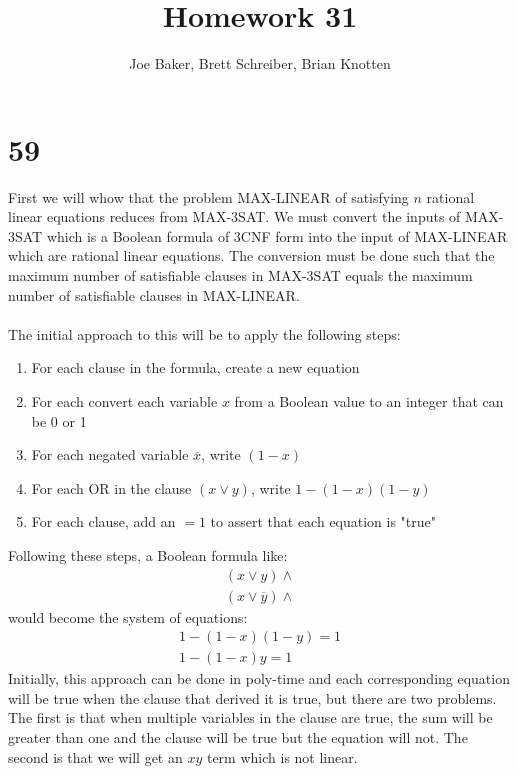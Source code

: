 \documentclass[letterpaper,notitlepage,twoside]{article}
\begin{document}
\title{Homework 31}
\author{Joe Baker, Brett Schreiber, Brian Knotten}
\maketitle

\section*{59}
First we will whow that the problem MAX-LINEAR of satisfying $n$ rational linear equations reduces from MAX-3SAT. We must convert the inputs of MAX-3SAT which is a Boolean formula of 3CNF form into the input of MAX-LINEAR which are rational linear equations. The conversion must be done such that the maximum number of satisfiable clauses in MAX-3SAT equals the maximum number of satisfiable clauses in MAX-LINEAR.
\\\\
The initial approach to this will be to apply the following steps:
\begin{enumerate}
\item For each clause in the formula, create a new equation
\item For each convert each variable $x$ from a Boolean value to an integer that can be 0 or 1
\item For each negated variable $\overline{x}$, write $(1-x)$
\item For each OR in the clause $(x \lor y)$, write $1 - (1 - x)(1 - y)$
\item For each clause, add an $= 1$ to assert that each equation is "true"
\end{enumerate}
Following these steps, a Boolean formula like:
\begin{gather*}
(x \vee y) \wedge \\
(x \vee \overline{y}) \wedge
\end{gather*}
would become the system of equations:
\begin{gather*}
1 - (1 - x)(1 - y)  = 1 \\
1 - (1 - x)y = 1
\end{gather*}
Initially, this approach can be done in poly-time and each corresponding equation will be true when the clause that derived it is true, but there are two problems. The first is that when multiple variables in the clause are true, the sum will be greater than one and the clause will be true but the equation will not. The second is that we will get an $xy$ term which is not linear.
\\\\
\end{document}
